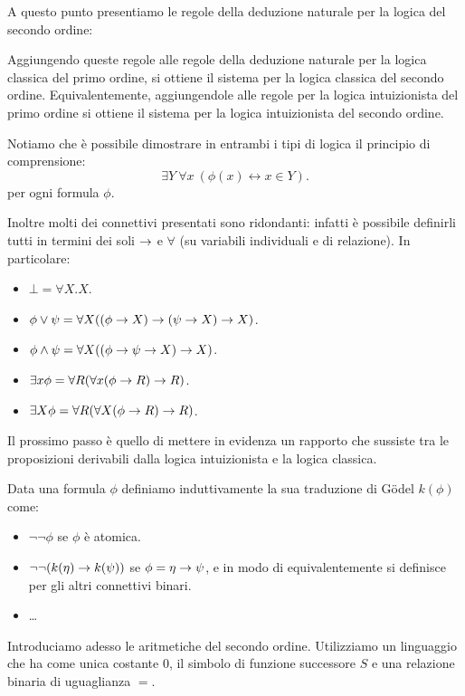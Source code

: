 \documentclass[]{marticle}
\begin{document}
A questo punto presentiamo le regole della deduzione naturale per la
logica del secondo ordine:

Aggiungendo queste regole alle regole della deduzione naturale per la logica
classica del primo ordine, si ottiene il sistema per la logica classica del
secondo ordine. Equivalentemente, aggiungendole alle regole per la logica
intuizionista del primo ordine si ottiene il sistema per la logica intuizionista
del secondo ordine.

Notiamo che \`e possibile dimostrare in entrambi i tipi di logica il principio
di comprensione:
\[
    \exists Y\ \forall x\ (\phi(x) \leftrightarrow x\in Y).
\]
per ogni formula $\phi$.

Inoltre molti dei connettivi presentati sono ridondanti: infatti \`e possibile
definirli tutti in termini dei soli $\rightarrow$ e $\forall$ (su variabili individuali
e di relazione). In particolare: 
\begin{itemize}
    \item $\bot = \forall X.X$.
    \item $\phi \lor \psi = \forall X ((\phi\rightarrow X)\rightarrow (\psi\rightarrow X) \rightarrow X)$.
    \item $\phi \land \psi = \forall X ((\phi\rightarrow\psi\rightarrow X) \rightarrow X)$.
    \item $\exists x \phi = \forall R (\forall x(\phi\rightarrow R)\rightarrow R)$.
    \item $\exists X \phi = \forall R (\forall X(\phi\rightarrow R)\rightarrow R)$.
\end{itemize}

Il prossimo passo \`e quello di mettere in evidenza un rapporto che sussiste tra
le proposizioni derivabili dalla logica intuizionista e la logica classica.
\begin{block}[Definizione]
    Data una formula $\phi$ definiamo induttivamente la sua traduzione di
    G\"odel $k(\phi)$ come:
    \begin{itemize}
        \item $\lnot\lnot \phi$ se $\phi$ \`e atomica.
        \item $\lnot\lnot(k(\eta)\rightarrow k(\psi))$ se $\phi=\eta\rightarrow\psi$, e in
            modo di equivalentemente si definisce per gli altri connettivi
            binari.
        \item \dots
    \end{itemize}
\end{block}

Introduciamo adesso le aritmetiche del secondo ordine. Utilizziamo un linguaggio
che ha come unica costante $0$, il simbolo di funzione successore $S$ e una
relazione binaria di uguaglianza $=$.
\end{document}
